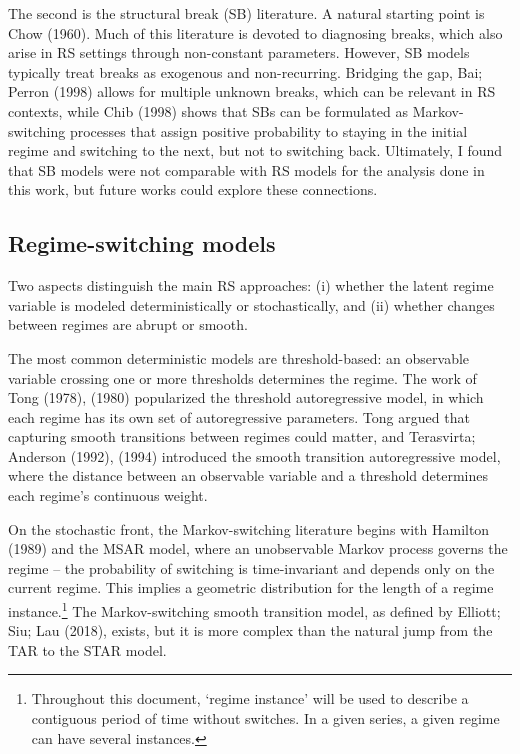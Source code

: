 \documentclass[
  letterpaper,
  DIV=11,
  numbers=noendperiod]{scrartcl}
\numberwithin{equation}{section}
\numberwithin{table}{section}
\numberwithin{figure}{section}
\begin{document}
The second is the structural break (SB) literature. A natural starting
point is Chow (1960). Much of this literature is devoted to diagnosing
breaks, which also arise in RS settings through non-constant parameters.
However, SB models typically treat breaks as exogenous and
non-recurring. Bridging the gap, Bai; Perron (1998) allows for multiple
unknown breaks, which can be relevant in RS contexts, while Chib (1998)
shows that SBs can be formulated as Markov-switching processes that
assign positive probability to staying in the initial regime and
switching to the next, but not to switching back. Ultimately, I found
that SB models were not comparable with RS models for the analysis done
in this work, but future works could explore these connections.

\subsection{Regime-switching models}\label{regime-switching-models}

Two aspects distinguish the main RS approaches: (i) whether the latent
regime variable is modeled deterministically or stochastically, and (ii)
whether changes between regimes are abrupt or smooth.

The most common deterministic models are threshold-based: an observable
variable crossing one or more thresholds determines the regime. The work
of Tong (1978), (1980) popularized the threshold autoregressive model,
in which each regime has its own set of autoregressive parameters. Tong
argued that capturing smooth transitions between regimes could matter,
and Terasvirta; Anderson (1992), (1994) introduced the smooth transition
autoregressive model, where the distance between an observable variable
and a threshold determines each regime's continuous weight.

On the stochastic front, the Markov-switching literature begins with
Hamilton (1989) and the MSAR model, where an unobservable Markov process
governs the regime -- the probability of switching is time-invariant and
depends only on the current regime. This implies a geometric
distribution for the length of a regime instance.\footnote{Throughout
  this document, `regime instance' will be used to describe a contiguous
  period of time without switches. In a given series, a given regime can
  have several instances.} The Markov-switching smooth transition model,
as defined by Elliott; Siu; Lau (2018), exists, but it is more complex
than the natural jump from the TAR to the STAR model.
\end{document}
